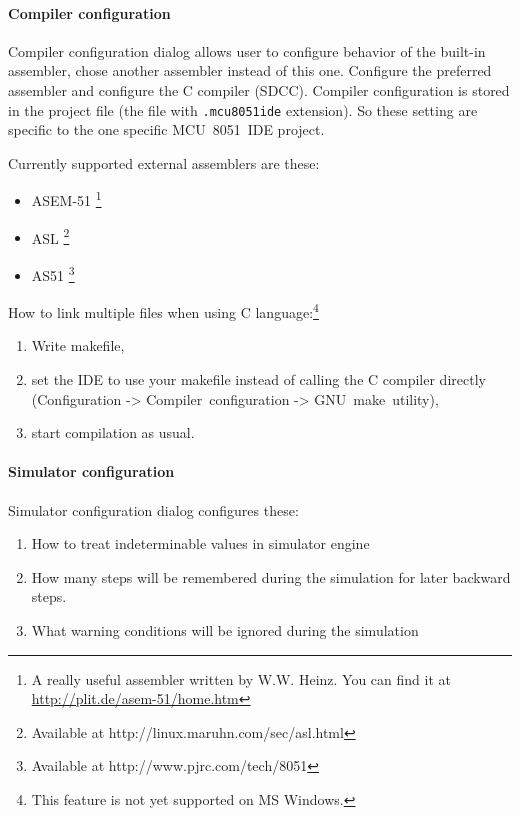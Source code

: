 \documentclass[a4paper,twoside,12pt]{book}
\newcommand{\fileextension}[1]{\texttt{#1}}
\begin{document}
		\paragraph{Compiler configuration}
			Compiler configuration dialog allows user to configure behavior of the built-in assembler, chose another assembler instead of this one. Configure the preferred assembler and configure the C compiler (SDCC). Compiler configuration is stored in the project file (the file with \fileextension{.mcu8051ide} extension). So these setting are specific to the one specific MCU~8051~IDE project.

			Currently supported external assemblers are these:
			\begin{itemize}
				\setlength{\itemsep}{-3pt}
				\item ASEM-51 \footnote{A really useful assembler written by W.W. Heinz. You can find it at \url{http://plit.de/asem-51/home.htm}}
				\item ASL \footnote{Available at http://linux.maruhn.com/sec/asl.html}
				\item AS51 \footnote{Available at http://www.pjrc.com/tech/8051}
			\end{itemize}

			How to link multiple files when using C language:\footnote{This feature is not yet supported on MS Windows.}
			\begin{enumerate}
				\item Write makefile,
				\item set the IDE to use your makefile instead of calling the C compiler directly (Configuration -> Compiler~configuration -> GNU~make~utility),
				\item start compilation as usual.
			\end{enumerate}

		\paragraph{Simulator configuration}
			Simulator configuration dialog configures these:
			\begin{enumerate}
				\item How to treat indeterminable values in simulator engine
				\item How many steps will be remembered during the simulation for later backward steps.
				\item What warning conditions will be ignored during the simulation
			\end{enumerate}
\end{document}
